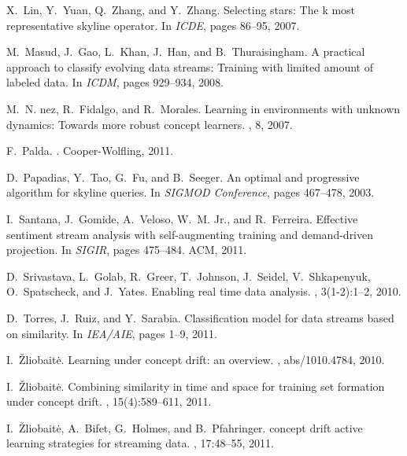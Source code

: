 \documentclass[twoside,leqno,twocolumn]{article}
\begin{document}
\begin{thebibliography}{10}
X.~Lin, Y.~Yuan, Q.~Zhang, and Y.~Zhang.
\newblock Selecting stars: The k most representative skyline operator.
\newblock In {\em ICDE}, pages 86--95, 2007.

M.~Masud, J.~Gao, L.~Khan, J.~Han, and B.~Thuraisingham.
\newblock A practical approach to classify evolving data streams: Training with
  limited amount of labeled data.
\newblock In {\em ICDM}, pages 929--934, 2008.

M.~N. {n}ez, R.~Fidalgo, and R.~Morales.
\newblock Learning in environments with unknown dynamics: Towards more robust
  concept learners.
, 8, 2007.

F.~Palda.
.
\newblock Cooper-Wolfling, 2011.

D.~Papadias, Y.~Tao, G.~Fu, and B.~Seeger.
\newblock An optimal and progressive algorithm for skyline queries.
\newblock In {\em SIGMOD Conference}, pages 467--478, 2003.

I.~Santana, J.~Gomide, A.~Veloso, W.~M. {Jr.}, and R.~Ferreira.
\newblock Effective sentiment stream analysis with self-augmenting training and
  demand-driven projection.
\newblock In {\em SIGIR}, pages 475--484. ACM, 2011.

D.~Srivastava, L.~Golab, R.~Greer, T.~Johnson, J.~Seidel, V.~Shkapenyuk,
  O.~Spatscheck, and J.~Yates.
\newblock Enabling real time data analysis.
, 3(1-2):1--2, 2010.

D.~Torres, J.~Ruiz, and Y.~Sarabia.
\newblock Classification model for data streams based on similarity.
\newblock In {\em IEA/AIE}, pages 1--9, 2011.

I.~\v{Z}liobait\.{e}.
\newblock Learning under concept drift: an overview.
, abs/1010.4784, 2010.

I.~\v{Z}liobait\.{e}.
\newblock Combining similarity in time and space for training set formation
  under concept drift.
, 15(4):589--611, 2011.

I.~\v{Z}liobait\.{e}, A.~Bifet, G.~Holmes, and B.~Pfahringer.
 concept drift active learning strategies for streaming data.
, 17:48--55, 2011.


\end{thebibliography}
\end{document}
